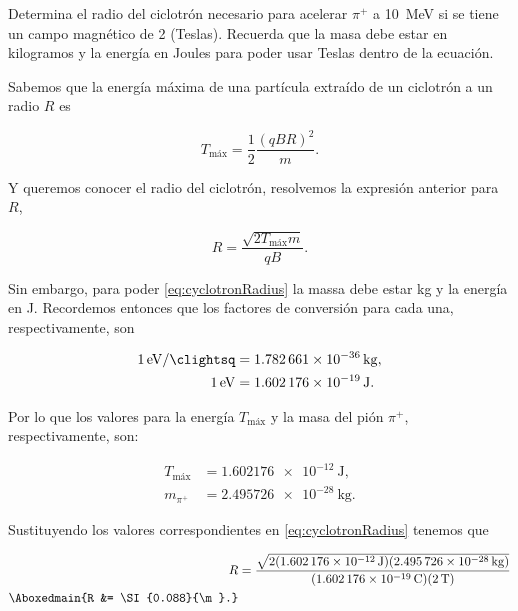 \documentclass[./../main.tex]{subfiles}
\begin{document}
    \begin{exercise}
        Determina el radio del ciclotrón necesario para acelerar \(\pi^{+}\) a \SI{10}{\MeV} si se tiene un campo magnético de \SI{2}{\T} (Teslas). Recuerda que la masa debe estar en kilogramos y la energía en Joules para poder usar Teslas dentro de la ecuación.

        \begin{solution}
            Sabemos que la energía máxima de una partícula extraído de un ciclotrón a un radio \(R\) es

            \begin{equation*}
                T_{\text{máx}} = \dfrac{1}{2}\dfrac{(qBR)^{2}}{m}.
            \end{equation*}

            Y queremos conocer el radio del ciclotrón, resolvemos la expresión anterior para \(R\),

            \begin{equation*}
                R = \dfrac{\sqrt{2T_{\text{máx}}m}}{qB}.
                \label{eq:cyclotronRadius}
            \end{equation*}

            Sin embargo, para poder \cref{eq:cyclotronRadius} la massa debe estar \unit{\kg} y la energía en \unit{\J}. Recordemos entonces que los factores de conversión para cada una, respectivamente, son

            \begin{align*}
                \SI{1}{\eV\per\clightsq} &= \SI{1.782661e-36}{\kg},\\
                \SI{1}{\eV} &= \SI{1.602176e-19}{\J}.
            \end{align*}

            Por lo que los valores para la energía \(T_{\text{máx}}\) y la masa del pión \(\pi^{+}\), respectivamente, son:

            \begin{align*}
                T_{\text{máx}} &= \SI{1.602176e-12}{\J},\\
                m_{\pi^{+}} &= \SI{2.495726e-28}{\kg}.
            \end{align*}

            Sustituyendo los valores correspondientes en \cref{eq:cyclotronRadius} tenemos que

            \begin{align*}
                R &= \dfrac{\sqrt{2(\SI{1.602176e-12}{\J})(\SI{2.495726E-28}{\kg})}}{(\SI{1.602176e-19}{\C})(\SI{2}{\T})}\\
                \Aboxedmain{R &= \SI{0.088}{\m}.}
            \end{align*}
        \end{solution}
    \end{exercise}
\end{document}
